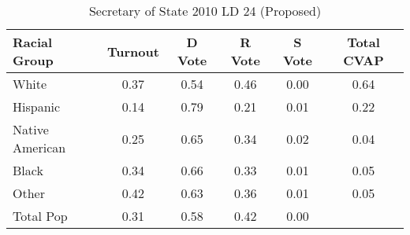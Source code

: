 \begin{table}[htb]
\begin{center}
\caption{Secretary of State 2010 LD 24 (Proposed)}
\label{sos10_cvap_ld_24}
\begin{tabular}{lccccc}
  \hline
Racial Group & Turnout & D Vote & R Vote & S Vote & Total CVAP \\ 
  \hline
White & 0.37 & 0.54 & 0.46 & 0.00 & 0.64 \\ 
  Hispanic & 0.14 & 0.79 & 0.21 & 0.01 & 0.22 \\ 
  Native American & 0.25 & 0.65 & 0.34 & 0.02 & 0.04 \\ 
  Black & 0.34 & 0.66 & 0.33 & 0.01 & 0.05 \\ 
  Other & 0.42 & 0.63 & 0.36 & 0.01 & 0.05 \\ 
  Total Pop & 0.31 & 0.58 & 0.42 & 0.00 &  \\ 
   \hline
\end{tabular}
\end{center}
\end{table}
